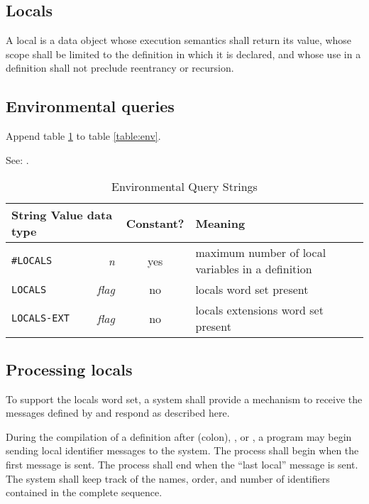 \subsection{Locals} %

A local is a data object whose execution semantics shall return its
value, whose scope shall be limited to the definition in which it is
declared, and whose use in a definition shall not preclude reentrancy
or recursion.

\subsection{Environmental queries} %

Append table \ref{local:env} to table \ref{table:env}.

See: .

\begin{table}[h]
  \begin{center}
	\caption{Environmental Query Strings}
	\label{local:env}
	\begin{tabular}{p{9em}rcp{}}
		\hline\hline
		\multicolumn{2}{l}{String \hfill Value data type} & Constant? & Meaning \\
		\hline
		\texttt{\#LOCALS}		& \emph{n}	& yes	&
			maximum number of local variables in a definition \\
		\texttt{LOCALS}	& \emph{flag}	& no	&
			locals word set present \\
		\texttt{LOCALS-EXT}	& \emph{flag}	& no	&
			locals extensions word set present \\
		\hline\hline
	\end{tabular}
  \end{center}
\end{table}

\subsection{Processing locals} %
\label{local:locals}

To support the locals word set, a system shall provide a mechanism
to receive the messages defined by  and respond as
described here.

During the compilation of a definition after \word[core]{:} (colon),
, or , a program may begin
sending local identifier messages to the system. The process shall
begin when the first message is sent. The process shall end when the
``last local'' message is sent. The system shall keep track of the
names, order, and number of identifiers contained in the complete
sequence.

